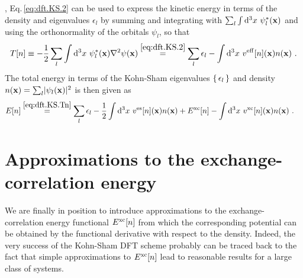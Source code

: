 , Eq.\,\eqref{eq:dft.KS.2} can be used to express the kinetic energy in terms of the density and eigenvalues $\epsilon_l$ by summing and integrating with $\sum_l \int {\rm d}^3 x~\psi^\ast_l ({\bf x})$ and using the orthonormality of the orbitals $\psi_l$, so that
\begin{align}
	T[n] 
		\equiv - \frac{1}{2}\sum_l \int \d^3 x ~ \psi^\ast_l ({\bf x}) \nabla^2 \psi({\bf x})
		\stackrel{\eqref{eq:dft.KS.2}}{=} 
			\sum_l \epsilon_l 
			- \int \d^3 x ~ v^{\rm eff}[n] ({\bf x}) n({\bf x})~.
	\label{eq:dft.KS.Tn}
\end{align}
The total energy in terms of the Kohn-Sham eigenvalues $\set{\epsilon_l}$ and density $n ({\bf x}) = \sum_l \lvert \psi_l ({\bf x}) \rvert^2$ is then given as
\begin{align}
	E[n]
		&\stackrel{\eqref{eq:dft.KS.Tn}}{=}
			\sum_l \epsilon_l 
			- \frac{1}{2} \int \d^3 x ~ v^{\rm es} [n] ({\bf x}) n ({\bf x})
			+ E^{\rm xc}[n]
			- \int \d^3 x ~ v^{\rm xc}[n] ({\bf x}) n ({\bf x})~.
	\label{eq:dft.KS.En}
\end{align}

\section{Approximations to the exchange-correlation energy}
\label{sec:dft.approximations}
We are finally in position to introduce approximations to the exchange-correlation energy functional $E^{\rm xc}[n]$ from which the corresponding potential can be obtained by the functional derivative with respect to the density. Indeed, the very success of the Kohn-Sham DFT scheme probably can be traced back to the fact that simple approximations to $E^{\rm xc}[n]$ lead to reasonable results for a large class of systems. 

